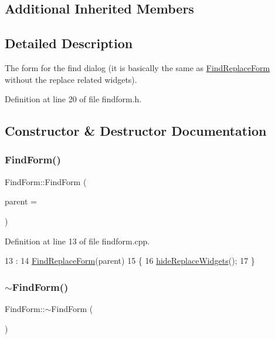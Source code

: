 \subsection*{Additional Inherited Members}


\subsection{Detailed Description}
The form for the find dialog (it is basically the same as \hyperlink{class_find_replace_form}{Find\+Replace\+Form} without the replace related widgets). 

Definition at line 20 of file findform.\+h.



\subsection{Constructor \& Destructor Documentation}
\mbox{\label{class_find_form_abcd5a2ae0b7d642134927bcef687410f}} 
\subsubsection{\texorpdfstring{Find\+Form()}{FindForm()}}
{\footnotesize\ttfamily Find\+Form\+::\+Find\+Form (\begin{DoxyParamCaption}\item[{Q\+Widget $\ast$}]{parent = {} }\end{DoxyParamCaption})}



Definition at line 13 of file findform.\+cpp.


\begin{DoxyCode}
13                                   :
14     \hyperlink{class_find_replace_form_ad168473a919873f5cf6f9531e9c7faf3}{FindReplaceForm}(parent)
15 \{
16     \hyperlink{class_find_replace_form_acd7c42b7ef674ca414d0e47158fdad31}{hideReplaceWidgets}();
17 \}
\end{DoxyCode}
\mbox{\label{class_find_form_a79950e64527805f37728704eb5577a15}} 
\subsubsection{\texorpdfstring{$\sim$\+Find\+Form()}{~FindForm()}}
{\footnotesize\ttfamily Find\+Form\+::$\sim$\+Find\+Form (\begin{DoxyParamCaption}{ }\end{DoxyParamCaption})}



